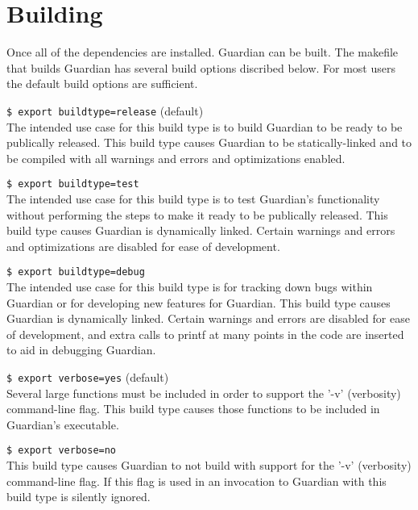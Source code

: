 
\section{Building}
{
	Once all of the dependencies are installed. Guardian can be built. The
	makefile that builds Guardian has several build options discribed below.
	For most users the default build options are sufficient.
	
	\begin{itemize}
	{
		\item {\texttt{\$ export buildtype=release} (default)}\\
		{
			The intended use case for this build type is to build Guardian to be
			ready to be publically released.
			This build type causes Guardian to be statically-linked and to be
			compiled with all warnings and errors and optimizations enabled.
		}
		
		\item {\texttt{\$ export buildtype=test}}\\
		{
			The intended use case for this build type is to test Guardian's
			functionality without
			performing the steps to make it ready to be publically released.
			This build type causes Guardian is dynamically linked.
			Certain warnings and errors and optimizations are disabled for
			ease of development.
		}
		
		\item {\texttt{\$ export buildtype=debug}}\\
		{
			The intended use case for this build type is for tracking down
			bugs within Guardian or for developing new features for Guardian.
			This build type causes Guardian is dynamically linked. Certain
			warnings and errors
			are disabled for ease of development, and extra calls to printf
			at many points in the code are inserted to aid in debugging Guardian.
		}
		
		\item {\texttt{\$ export verbose=yes} (default)}\\
		{
			Several large functions must be included in order to support the
			'-v' (verbosity) command-line flag. This build type causes those
			functions to be included in Guardian's executable.
		}
		
		\item {\texttt{\$ export verbose=no}}\\
		{
			This build type causes Guardian to not build with support for the
			'-v' (verbosity) command-line flag. If this flag is used in an
			invocation to Guardian with this build type is silently ignored.
		}
		
}
\end{itemize}}
